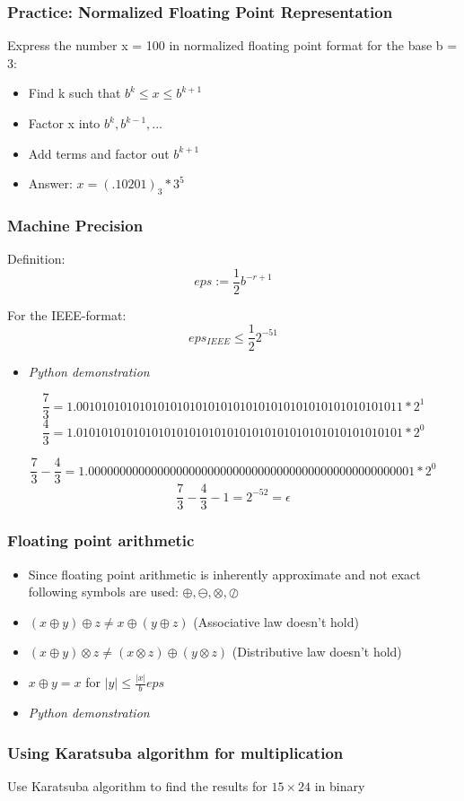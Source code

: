 \documentclass{beamer}
\begin{document}
\begin{frame}
\frametitle{Practice: Normalized Floating Point Representation}

Express the number x = 100 in normalized floating point format for the base b = 3: 
\pause

\begin{itemize}
\item Find k such that $b^k \leq x \leq b^{k+1}$
\item Factor x into $b^k, b^{k-1},...$
\item Add terms and factor out $b^{k+1}$ \pause
\item Answer: $x = (.10201)_3 * 3^5$

\end{itemize}

\end{frame}


\begin{frame}
\frametitle{Machine Precision}
Definition:
$$eps := \frac{1}{2}b^{-r+1}$$

For the IEEE-format:
$$eps_{IEEE} \leq \frac{1}{2}2^{-51}$$

\begin{itemize}
\item \textit{Python demonstration}
\end{itemize}
\pause


$$\frac{7}{3} = 1.0010101010101010101010101010101010101010101010101011*2^1$$
 $$\frac{4}{3} = 1.0101010101010101010101010101010101010101010101010101*2^0$$

$$\frac{7}{3} -\frac{4}{3} =  1.0000000000000000000000000000000000000000000000000001*2^0$$
$$\frac{7}{3} -\frac{4}{3} - 1 = 2^{-52} = \epsilon$$



\end{frame}

\begin{frame}
\frametitle{Floating point arithmetic}
\begin{itemize}
\item Since floating point arithmetic is inherently approximate and not exact following symbols are used: $\oplus,\ominus, \otimes,\oslash$
\item  $(x \oplus y) \oplus z \neq x \oplus (y \oplus z) $ (Associative law doesn't hold)
\item $(x \oplus y) \otimes z \neq (x \otimes z) \oplus (y \otimes z) $ (Distributive law doesn't hold)
\item $x \oplus y = x$ for $|y| \leq \frac{|x|}{b}eps$
\item \textit{Python demonstration}
\end{itemize}
\end{frame}


\begin{frame}
\frametitle{Using Karatsuba algorithm for multiplication}
Use Karatsuba algorithm to find the results for $15 \times 24$ in binary 


\end{frame}
\end{document}
